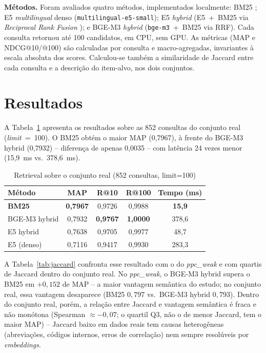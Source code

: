 \documentclass[12pt]{article}
\begin{document}
\textbf{M\'etodos.} Foram avaliados quatro m\'etodos, implementados localmente: BM25 \cite{robertson:09}; E5 \emph{multilingual} denso \cite{wang:22} (\texttt{multilingual-e5-small}); E5 \emph{hybrid} (E5~+~BM25 via \emph{Reciprocal Rank Fusion} \cite{cormack:09}); e BGE-M3 \emph{hybrid} \cite{chen:24} (\texttt{bge-m3}~+~BM25 via RRF). Cada consulta retornou at\'e 100 candidatos, em CPU, sem GPU. As m\'etricas (MAP e NDCG@10/@100) s\~ao calculadas por consulta e macro-agregadas, invariantes \`a escala absoluta dos scores. Calculou-se tamb\'em a similaridade de Jaccard entre cada consulta e a descri\c{c}\~ao do item-alvo, nos dois conjuntos.

\section{Resultados}

A Tabela~\ref{tab:resultados} apresenta os resultados sobre as 852 consultas do conjunto real (\emph{limit}~=~100). O BM25 obt\'em o maior MAP (0,7967), \`a frente do BGE-M3 hybrid (0,7932) -- diferen\c{c}a de apenas 0,0035 -- com lat\^encia 24 vezes menor (15,9~ms vs.\ 378,6~ms).

\begin{table}[ht]
\centering
\small
\caption{Retrieval sobre o conjunto real (852 consultas, limit=100)}
\label{tab:resultados}
\begin{tabular}{|l|c|c|c|c|}
\hline
\textbf{M\'etodo} & \textbf{MAP} & \textbf{R@10} & \textbf{R@100} & \textbf{Tempo (ms)} \\
\hline
\textbf{BM25} & \textbf{0,7967} & 0,9726 & 0,9988 & \textbf{15,9} \\
\hline
BGE-M3 hybrid & 0,7932 & \textbf{0,9767} & \textbf{1,0000} & 378,6 \\
\hline
E5 hybrid & 0,7638 & 0,9705 & 0,9977 & 48,7 \\
\hline
E5 (denso) & 0,7116 & 0,9417 & 0,9930 & 283,3 \\
\hline
\end{tabular}
\end{table}

A Tabela~\ref{tab:jaccard} confronta esse resultado com o do \emph{ppc\_weak} e com quartis de Jaccard dentro do conjunto real. No \emph{ppc\_weak}, o BGE-M3 hybrid supera o BM25 em $+0{,}152$ de MAP -- a maior vantagem sem\^antica do estudo; no conjunto real, essa vantagem desaparece (BM25 $0{,}797$ vs.\ BGE-M3 hybrid $0{,}793$). Dentro do conjunto real, por\'em, a rela\c{c}\~ao entre Jaccard e vantagem sem\^antica \'e fraca e n\~ao mon\'otona (Spearman $\approx-0{,}07$; o quartil Q3, n\~ao o de menor Jaccard, tem o maior MAP) -- Jaccard baixo em dados reais tem causas heterog\^eneas (abrevia\c{c}\~oes, c\'odigos internos, erros de correla\c{c}\~ao) nem sempre resol\'uveis por \emph{embeddings}.
\end{document}
